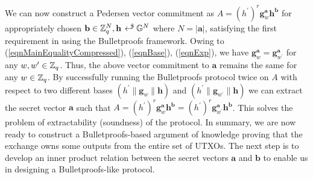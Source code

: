 
We can now construct a Pedersen vector commitment as $A = (h^{\prime})^{r}\textbf{g}_w^{\textbf{a}} \textbf{h}^{\textbf{b}}$ for appropriately chosen $\textbf{b} \in \Z_q^{N}, \textbf{h} \rgen \G^{N}$ where $N = |\textbf{a}|$,
satisfying the first requirement in using the Bulletproofs framework.
Owing to (\ref{eqnMainEqualityCompressed}), (\ref{eqnBase}), (\ref{eqnExp}), we have $\textbf{g}_w^{\textbf{a}} = \textbf{g}_{w^{\prime}}^{\textbf{a}}$ for any $w, w^{\prime} \in \mathbb{Z}_q$.
Thus, the above vector commitment to $\textbf{a}$ remains the same for any $w \in \mathbb{Z}_q$. By successfully running the Bulletproofs protocol twice on $A$ with respect to two different bases
$(h^{\prime} \| \textbf{g}_w \| \textbf{h})$ and $(h^{\prime} \| \textbf{g}_{w^{\prime}} \| \textbf{h})$ we can extract the secret vector $\textbf{a}$ such that $A = (h^{\prime})^{r}\textbf{g}_w^{\textbf{a}} \textbf{h}^{\textbf{b}} = (h^{\prime})^{r}\textbf{g}_{w^{\prime}}^{\textbf{a}} \textbf{h}^{\textbf{b}}$.
This solves the problem of extractability (soundness) of the protocol.
In summary, we are now ready to construct a Bulletproofs-based argument of knowledge proving that the exchange owns some outputs from the entire set of UTXOs.
The next step is to develop an inner product relation between the secret vectors $\textbf{a}$ and $\textbf{b}$ to enable us in designing a Bulletproofs-like protocol.



